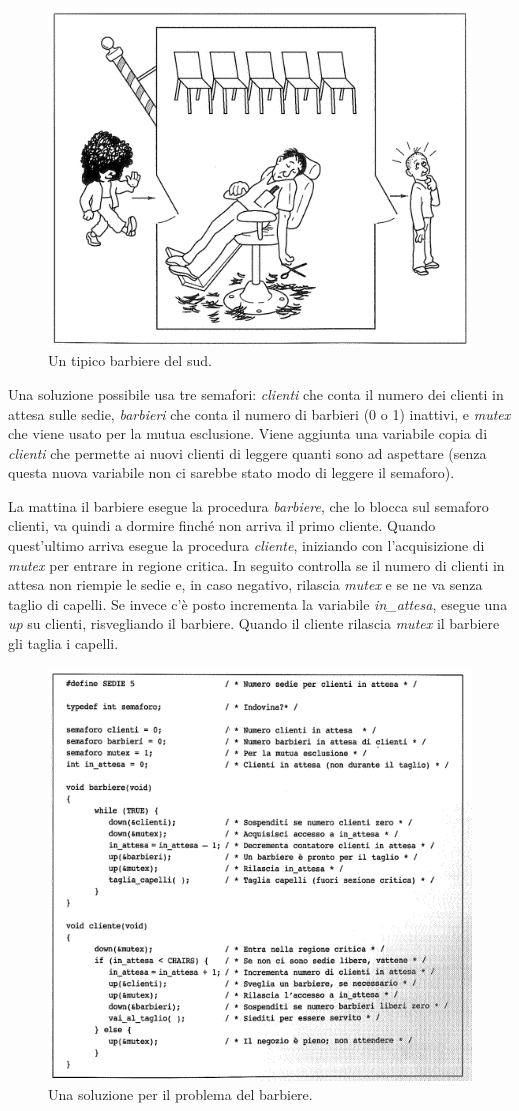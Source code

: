 \begin{figure}[H]
    \centering
    \includegraphics[width=0.5\linewidth]{assets/barbiere6.png}
    \caption{Un tipico barbiere del sud.}
\end{figure}


Una soluzione possibile usa tre semafori: \textit{clienti} che conta il numero dei clienti in attesa sulle sedie, \textit{barbieri} che conta il numero di barbieri (0 o 1) inattivi, e \textit{mutex} che viene usato per la mutua esclusione. Viene aggiunta una variabile copia di \textit{clienti} che permette ai nuovi clienti di leggere quanti sono ad aspettare (senza questa nuova variabile non ci sarebbe stato modo di leggere il semaforo). 

La mattina il barbiere esegue la procedura \textit{barbiere}, che lo blocca sul semaforo clienti, va quindi a dormire finché non arriva il primo cliente. Quando quest'ultimo arriva esegue la procedura \textit{cliente}, iniziando con l'acquisizione di \textit{mutex} per entrare in regione critica. In seguito controlla se il numero di clienti in attesa non riempie le sedie e, in caso negativo, rilascia \textit{mutex} e se ne va senza taglio di capelli. Se invece c'è posto incrementa la variabile \textit{in\_attesa}, esegue una \textit{up} su clienti, risvegliando il barbiere. Quando il cliente rilascia \textit{mutex} il barbiere gli taglia i capelli.

\begin{figure}[H]
    \centering
    \includegraphics[width=0.5\linewidth]{assets/soluzionebarbiere6.png}
    \caption{Una soluzione per il problema del barbiere.}
\end{figure}
